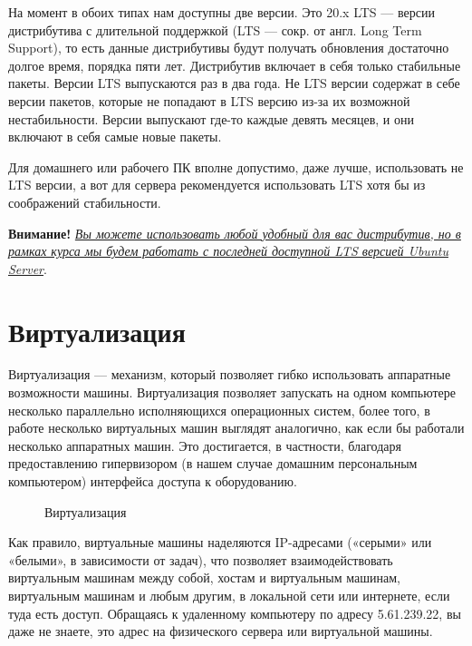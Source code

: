 \documentclass[14pt, a4paper]{article}
\begin{document}
На момент в обоих типах нам доступны две версии. Это 20.x LTS — версии дистрибутива с
длительной поддержкой (LTS — сокр. от англ. Long Term Support), то есть данные дистрибутивы будут
получать обновления достаточно долгое время, порядка пяти лет. Дистрибутив включает в себя
только стабильные пакеты. Версии LTS выпускаются раз в два года. Не LTS версии содержат в себе
версии пакетов, которые не попадают в LTS версию из-за их возможной нестабильности. Версии
выпускают где-то каждые девять месяцев, и они включают в себя самые новые пакеты.

Для домашнего или рабочего ПК вполне допустимо, даже лучше, использовать не LTS версии,
а вот для сервера рекомендуется использовать LTS хотя бы из соображений стабильности.

\textbf{Внимание!} \textit{\uline{Вы можете использовать любой удобный для вас дистри\-бутив, но в рамках
курса мы будем работать с последней доступной LTS версией Ubuntu Server}}.



\section*{Виртуализация}

Виртуализация — механизм, который позволяет гибко использовать аппаратные возможности
машины. Виртуализация позволяет запускать на одном компьютере несколько параллельно
исполняющихся операционных систем, более того, в работе несколько виртуальных машин выглядят
аналогично, как если бы работали несколько аппаратных машин. Это достигается, в частности,
благодаря предоставлению гипервизором (в нашем случае домашним персональным компьютером)
интерфейса доступа к оборудованию.

\begin{figure}[h]%
    \centering
    \caption{Виртуализация\\}
    \label{1.1} %
\end{figure}

Как правило, виртуальные машины наделяются IP-адресами («серыми» или «белыми», в
зависимости от задач), что позволяет взаимодействовать виртуальным машинам между собой, хостам
и виртуальным машинам, виртуальным машинам и любым другим, в локальной сети или интернете,
если туда есть доступ. Обращаясь к удаленному компьютеру по адресу 5.61.239.22, вы даже не
знаете, это адрес на физического сервера или виртуальной машины.
\end{document}
